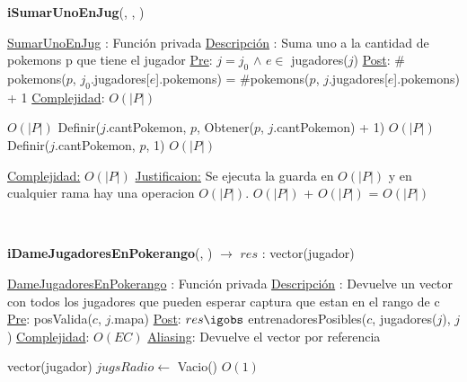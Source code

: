 \begin{Algoritmos}
\begin{algorithm}[H]
\begin{algorithmic}[1]
\end{algorithmic}
\end{algorithm}  
  


\begin{algorithm}[H]
{\textbf{iSumarUnoEnJug}(, , )}
\begin{algorithmic}[1]

\Statex \underline{SumarUnoEnJug} : Funci\'on privada 
\Statex \underline{Descripci\'on} : Suma uno a la cantidad de pokemons p que tiene el jugador 
\Statex \underline{Pre}: $j = j_0$ $\land$  $e \in$ jugadores($j$)
\Statex \underline{Post}: $\#$pokemons($p$, $j_0$.jugadores[$e$].pokemons) = $\#$pokemons($p$, $j$.jugadores[$e$].pokemons) + 1
\Statex \underline{Complejidad}: $O(|P|)$ 

 \Comment $O(|P|)$
  \State Definir($j$.cantPokemon, $p$, Obtener($p$, $j$.cantPokemon) + 1) \Comment $O(|P|)$
\Else
  \State Definir($j$.cantPokemon, $p$, 1)  \Comment $O(|P|)$
\EndIf


\medskip
\Statex \underline{Complejidad:} $O(|P|)$
\Statex \underline{Justificaion:} Se ejecuta la guarda en $O(|P|)$ y en cualquier rama hay una operacion $O(|P|)$. $O(|P|)$ + $O(|P|)$ = $O(|P|)$

\end{algorithmic}
\end{algorithm}  
  

$ $\newline
$ $\newline
$ $\newline



{\textbf{iDameJugadoresEnPokerango}(, ) $\to$ $res$ : vector(jugador)}
\begin{algorithmic}[1]

\Statex \underline{DameJugadoresEnPokerango} : Funci\'on privada 
\Statex \underline{Descripci\'on} : Devuelve un vector con todos los jugadores que pueden esperar captura que estan en el rango de c 
\Statex \underline{Pre}: posValida($c$, $j$.mapa)
\Statex \underline{Post}: $res \igobs$ entrenadoresPosibles($c$, jugadores($j$), $j$)
\Statex \underline{Complejidad}: $O(EC)$ 
\Statex \underline{Aliasing}: Devuelve el vector por referencia 

\State vector(jugador) $jugsRadio \gets$ Vacio() \Comment $O(1)$


\end{algorithmic}
\end{Algoritmos}

